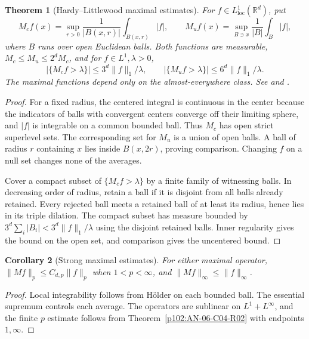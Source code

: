 \documentclass[11pt,oneside,openany]{book}
\newtheorem{theorem}{Theorem}[chapter]
\newtheorem{corollary}[theorem]{Corollary}
\theoremstyle{definition}
\theoremstyle{remark}
\begin{document}
\begin{theorem}[Hardy--Littlewood maximal estimates]
\label{p102:AN-06-C03-R01}
For \(f\in L^1_{\mathrm{loc}}(\mathbb R^d)\), put
\[
 M_cf(x)=\sup_{r>0}\frac1{|B(x,r)|}\int_{B(x,r)}|f|,
 \qquad
 M_uf(x)=\sup_{B\ni x}\frac1{|B|}\int_B|f|,
\]
where \(B\) runs over open Euclidean balls. Both functions are measurable, \(M_c\le M_u\le 2^dM_c\), and for \(f\in L^1,\lambda>0\),
\[
 |\{M_cf>\lambda\}|\le 3^d\|f\|_1/\lambda,\qquad
 |\{M_uf>\lambda\}|\le 6^d\|f\|_1/\lambda.
\]
The maximal functions depend only on the almost-everywhere class. See \cite[\S2.1.1]{grafakos} and \cite[Chapter I]{stein}.
\end{theorem}
\begin{proof}
For a fixed radius, the centered integral is continuous in the center because the indicators of balls with convergent centers converge off their limiting sphere, and \(|f|\) is integrable on a common bounded ball. Thus \(M_c\) has open strict superlevel sets. The corresponding set for \(M_u\) is a union of open balls. A ball of radius \(r\) containing \(x\) lies inside \(B(x,2r)\), proving comparison. Changing \(f\) on a null set changes none of the averages.

Cover a compact subset of \(\{M_cf>\lambda\}\) by a finite family of witnessing balls. In decreasing order of radius, retain a ball if it is disjoint from all balls already retained. Every rejected ball meets a retained ball of at least its radius, hence lies in its triple dilation. The compact subset has measure bounded by \(3^d\sum_i |B_i|<3^d\|f\|_1/\lambda\) using the disjoint retained balls. Inner regularity gives the bound on the open set, and comparison gives the uncentered bound.
\end{proof}

\begin{corollary}[Strong maximal estimates]
\label{p102:AN-06-C03-R02}
For either maximal operator, \(\|Mf\|_p\le C_{d,p}\|f\|_p\) when \(1<p<\infty\), and \(\|Mf\|_\infty\le\|f\|_\infty\).
\end{corollary}
\begin{proof}
Local integrability follows from Hölder on each bounded ball. The essential supremum controls each average. The operators are sublinear on \(L^1+L^\infty\), and the finite \(p\) estimate follows from Theorem~\ref{p102:AN-06-C04-R02} with endpoints \(1,\infty\).
\end{proof}
\end{document}
